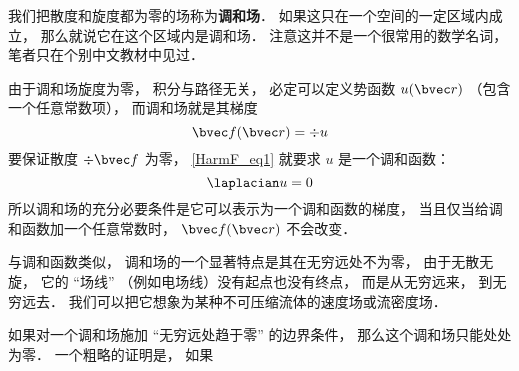 
\begin{issues}
\issueDraft
\end{issues}


我们把散度和旋度都为零的场称为\textbf{调和场}． 如果这只在一个空间的一定区域内成立， 那么就说它在这个区域内是调和场． 注意这并不是一个很常用的数学名词， 笔者只在个别中文教材中见过．

由于调和场旋度为零， 积分与路径无关， 必定可以定义势函数 $u(\bvec r)$ （包含一个任意常数项）， 而调和场就是其梯度
\begin{equation}\label{HarmF_eq1}
\bvec f(\bvec r) = \div u
\end{equation}
要保证散度 $\div \bvec f$ 为零， \autoref{HarmF_eq1} 就要求 $u$ 是一个调和函数：
\begin{equation}
\laplacian u = 0
\end{equation}
所以调和场的充分必要条件是它可以表示为一个调和函数的梯度， 当且仅当给调和函数加一个任意常数时， $\bvec f(\bvec r)$ 不会改变．

与调和函数类似， 调和场的一个显著特点是其在无穷远处不为零， 由于无散无旋， 它的 “场线” （例如电场线）没有起点也没有终点， 而是从无穷远来， 到无穷远去． 我们可以把它想象为某种不可压缩流体的速度场或流密度场．

如果对一个调和场施加 “无穷远处趋于零” 的边界条件， 那么这个调和场只能处处为零．
一个粗略的证明是， 如果
